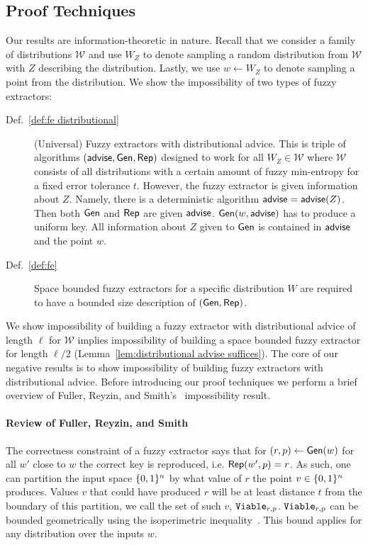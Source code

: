 \subsection{Proof Techniques}
Our results are information-theoretic in nature. Recall that we consider a family of distributions $\mathcal{W}$ and use $W_Z$ to denote sampling a random distribution from $\mathcal{W}$ with $Z$ describing the distribution.  Lastly, we use $w\leftarrow W_Z$ to denote sampling a point from the distribution.  We show the impossibility of two types of fuzzy extractors:
\begin{description}
\item[Def.~\ref{def:fe distributional}] (Universal) Fuzzy extractors with distributional advice.  This is triple of algorithms $({\mathsf{advise}}, {\mathsf{Gen}}, {\mathsf{Rep}})$ designed to work for all $W_Z \in \mathcal{W}$ where $\mathcal{W}$ consists of all distributions with a certain amount of fuzzy min-entropy for a fixed error tolerance $t$.  However, the fuzzy extractor is given information about $Z$.  Namely, there is a deterministic algorithm ${\mathsf{advise}} = {\mathsf{advise}}(Z)$. Then both ${\mathsf{Gen}}$ and ${\mathsf{Rep}}$ are given ${\mathsf{advise}}$. ${\mathsf{Gen}}(w, {\mathsf{advise}})$ has to produce a uniform key.  All information about $Z$ given to ${\mathsf{Gen}}$ is contained in ${\mathsf{advise}}$ and the point $w$.
\item[Def.~\ref{def:fe}] Space bounded fuzzy extractors for a specific distribution $W$ are required to have a bounded size description of $({\mathsf{Gen}}, {\mathsf{Rep}})$.
\end{description}

We show impossibility of building a fuzzy extractor with distributional advice of length $\ell$ for $\mathcal{W}$ implies impossibility of building a space bounded fuzzy extractor for length $\ell/2$ (Lemma~\ref{lem:distributional advise suffices}). 
The core of our negative results is to show impossibility of building fuzzy extractors with distributional advice.   Before introducing our proof techniques we perform a brief overview of Fuller, Reyzin, and Smith's~\cite{fuller2020fuzzy} impossibility result.

\paragraph{Review of Fuller, Reyzin, and Smith~\cite{fuller2020fuzzy}}
The correctness constraint of a fuzzy extractor says that for $(r, p)\leftarrow {\ensuremath{\mathsf{Gen}}}(w)$ for all $w'$ close to $w$ the correct key is reproduced, i.e. ${\mathsf{Rep}}(w', p)=r$.  As such, one can partition the input space $\{0, 1\}^n$ by what value of $r$ the point  $v\in \{0, 1\}^n$ produces.  Values $v$ that could have produced  $r$ will be at least distance $t$ from the boundary of this partition, we call the set of such $v$, $\mathtt{Viable}_{r,p}$.  $\mathtt{Viable}_{r,p}$ can be bounded geometrically using the isoperimetric inequality~\cite{harper1966optimal}.  This bound applies for any distribution over the inputs $w$.

